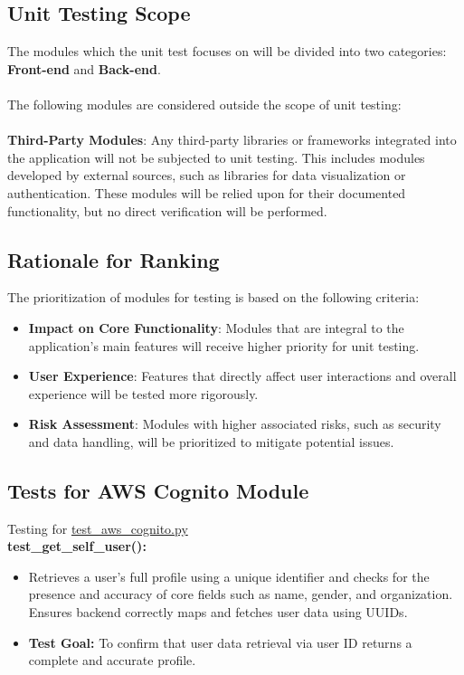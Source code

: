 \documentclass[12pt, titlepage]{article}
\begin{document}
\begin{enumerate}
\subsection{Unit Testing Scope}
The modules which the unit test focuses on will be divided into two categories: \textbf{Front-end} and \textbf{Back-end}.\\\\
The following modules are considered outside the scope of unit testing:\\\\
\textbf{Third-Party Modules}: 
Any third-party libraries or frameworks integrated into the application will not be subjected to unit testing. This includes modules developed by external sources, such as libraries for data visualization or authentication. These modules will be relied upon for their documented functionality, but no direct verification will be performed.


\subsection{Rationale for Ranking}
The prioritization of modules for testing is based on the following criteria:
\begin{itemize}
    \item[-] \textbf{Impact on Core Functionality}: Modules that are integral to the application's main features will receive higher priority for unit testing.
    \item[-] \textbf{User Experience}: Features that directly affect user interactions and overall experience will be tested more rigorously.
    \item[-] \textbf{Risk Assessment}: Modules with higher associated risks, such as security and data handling, will be prioritized to mitigate potential issues.
\end{itemize}

\subsection{Tests for AWS Cognito Module}
Testing for \href{https://github.com/RezaJodeiri/CXR-Capstone/blob/main/src/backend/test/test_aws_conito.py}{test\_aws\_cognito.py} \\

\textbf{test\_get\_self\_user():}  
\begin{itemize}
    \item Retrieves a user's full profile using a unique identifier and checks for the presence and accuracy of core fields such as name, gender, and organization. Ensures backend correctly maps and fetches user data using UUIDs.
    \item \textbf{Test Goal:} To confirm that user data retrieval via user ID returns a complete and accurate profile. 
    \newline
\end{itemize}


\end{enumerate}
\end{document}
